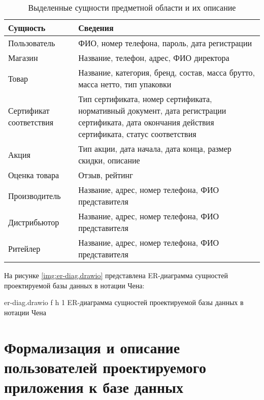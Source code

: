 \begin{table}[!h]
	\begin{center}
		\begin{threeparttable}
			\caption{Выделенные сущности предметной области и их описание}
			\label{tbl:db_entities}
			\begin{tabular}{|p{4.5cm}|p{10cm}|}
				\hline
				\textbf{Сущность} & \textbf{Сведения} \\ \hline
				Пользователь & ФИО, номер телефона, пароль, дата регистрации \\ 
				\hline
				Магазин & Название, телефон, адрес, ФИО директора \\ 
				\hline
				Товар & Название, категория, бренд, состав, масса брутто, масса нетто, тип упаковки \\ 
				\hline
				Сертификат соответствия & Тип сертификата, номер сертификата, нормативный документ, дата регистрации сертификата, дата окончания действия сертификата, статус соответствия \\ 
				\hline
				Акция & Тип акции, дата начала, дата конца, размер скидки, описание \\ 
				\hline
				Оценка товара & Отзыв, рейтинг \\ 
				\hline
				Производитель & Название, адрес, номер телефона, ФИО представителя \\ 
				\hline
				Дистрибьютор & Название, адрес, номер телефона, ФИО представителя \\ 
				\hline
				Ритейлер & Название, адрес, номер телефона, ФИО представителя \\ 
				\hline
			\end{tabular}
		\end{threeparttable}
	\end{center}
\end{table}

\clearpage

На рисунке \ref{img:er-diag.drawio} представлена ER-диаграмма сущностей проектируемой базы данных в нотации Чена:

{er-diag.drawio} %
{f} %
{h} %
{1\textwidth} %
{ER-диаграмма сущностей проектируемой базы данных в нотации Чена} %

\clearpage

\section{Формализация и описание пользователей проектируемого приложения к базе данных}

